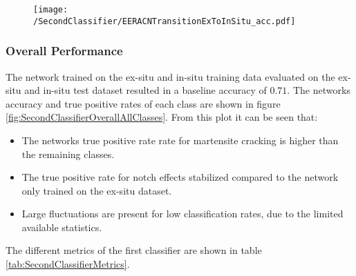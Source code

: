 \begin{figure}[H]
\centering
\texttt{[image: /SecondClassifier/EERACNTransitionExToInSitu\_acc.pdf]}
\end{figure}


\subsubsection{Overall Performance}
The network trained on the ex-situ and in-situ training data evaluated on the ex-situ and in-situ test dataset resulted in a baseline accuracy of $0.71$. The networks accuracy and true positive rates of each class are shown in figure \ref{fig:SecondClassifierOverallAllClasses}. From this plot it can be seen that:
\begin{itemize}
\item The networks true positive rate rate for martensite cracking is higher than the remaining classes.
\item The true positive rate for notch effects stabilized compared to the network only trained on the ex-situ dataset. 
\item Large fluctuations are present for low classification rates, due to the limited available statistics.
\end{itemize}
The different metrics of the first classifier are shown in table \ref{tab:SecondClassifierMetrics}.

